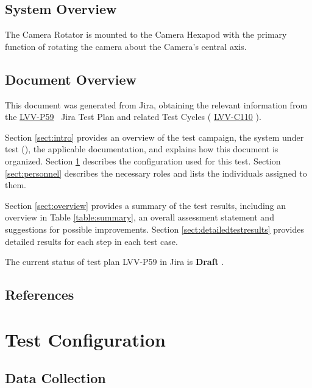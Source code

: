 \documentclass[SE,lsstdraft,STR,toc]{lsstdoc}
\begin{document}
\subsection{System Overview}
\label{sect:systemoverview}

The Camera Rotator is mounted to the Camera Hexapod with the primary
function of rotating the camera about the Camera's central axis.


\subsection{Document Overview}
\label{sect:docoverview}

This document was generated from Jira, obtaining the relevant information from the 
\href{https://jira.lsstcorp.org/secure/Tests.jspa#/testPlan/LVV-P59}{LVV-P59}
~Jira Test Plan and related Test Cycles (
  \href{https://jira.lsstcorp.org/secure/Tests.jspa#/testCycle/LVV-C110}{LVV-C110}
).

Section \ref{sect:intro} provides an overview of the test campaign, the system under test (\product{}), the applicable documentation, and explains how this document is organized.
Section \ref{sect:configuration}  describes the configuration used for this test.
Section \ref{sect:personnel} describes the necessary roles and lists the individuals assigned to them.

Section \ref{sect:overview} provides a summary of the test results, including an overview in Table \ref{table:summary}, an overall assessment statement and suggestions for possible improvements.
Section \ref{sect:detailedtestresults} provides detailed results for each step in each test case.

The current status of test plan LVV-P59 in Jira is \textbf{ Draft }.

\subsection{References}
\label{sect:references}
\renewcommand{\refname}{}

\section{Test Configuration}
\label{sect:configuration}

\subsection{Data Collection}
\end{document}

